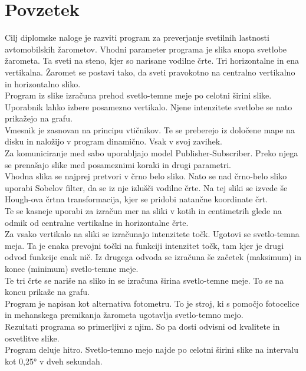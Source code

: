 \documentclass[oneside, a4paper, 12pt]{book}
\renewcommand{\chaptermark}[1]%
{\markboth{\MakeUppercase{\thechapter.\ #1}}{}} \renewcommand{\sectionmark}[1]%
\newcommand{\clearemptydoublepage}{\newpage{\pagestyle{empty}\cleardoublepage}}
\begin{document}
\clearemptydoublepage

\chapter*{Povzetek}
\chaptermark{}
Cilj diplomske naloge je razviti program za preverjanje svetilnih lastnosti avtomobilskih žarometov. Vhodni parameter programa je slika snopa svetlobe žarometa. Ta sveti na steno, kjer so narisane vodilne črte. Tri horizontalne in ena vertikalna. Žaromet se postavi tako, da sveti pravokotno na centralno vertikalno in horizontalno sliko. \\
Program iz slike izračuna prehod svetlo-temne meje po celotni širini slike. Uporabnik lahko izbere posamezno vertikalo. Njene intenzitete svetlobe se nato prikažejo na grafu.\\
Vmesnik je zasnovan na principu vtičnikov. Te se preberejo iz določene mape na disku in naložijo v program dinamično. Vsak v svoj zavihek.\\
Za komuniciranje med sabo uporabljajo model Publisher-Subscriber. Preko njega se prenašajo slike med posameznimi koraki in drugi parametri.\\
Vhodna slika se najprej pretvori v črno belo sliko. Nato se nad črno-belo sliko uporabi Sobelov filter, da se iz nje izlušči vodilne črte. Na tej sliki se izvede še Hough-ova črtna transformacija, kjer se pridobi natančne koordinate črt.\\
Te se kasneje uporabi za izračun mer na sliki v kotih in centimetrih glede na odmik od centralne vertikalne in horizontalne črte.\\
Za vsako vertikalo na sliki se izračunajo intenzitete točk. Ugotovi se svetlo-temna meja. Ta je enaka prevojni točki na funkciji intenzitet točk, tam kjer je drugi odvod funkcije enak nič. Iz drugega odvoda se izračuna še začetek (maksimum) in konec (minimum) svetlo-temne meje.\\
Te tri črte se nariše na sliko in se izračuna širina svetlo-temne meje. To se na koncu prikaže na grafu.\\
Program je napisan kot alternativa fotometru. To je stroj, ki s pomočjo fotocelice in mehanskega premikanja žarometa ugotavlja svetlo-temno mejo.\\
Rezultati programa so primerljivi z njim. So pa dosti odvisni od kvalitete in osvetlitve slike.\\
Program deluje hitro. Svetlo-temno mejo najde po celotni širini slike na intervalu kot 0,25° v dveh sekundah.
\clearemptydoublepage
\end{document}
